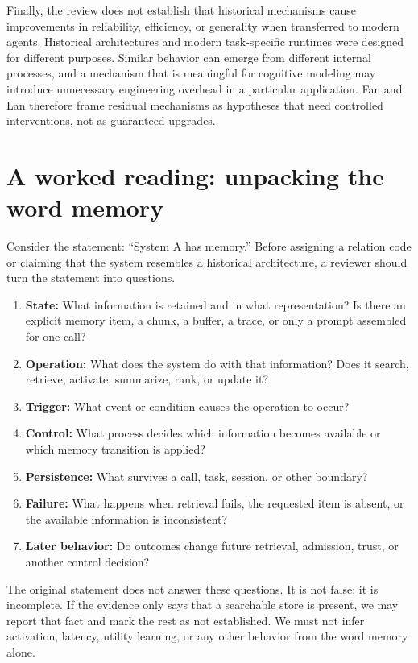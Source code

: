 Finally, the review does not establish that historical mechanisms cause improvements in reliability, efficiency, or generality when transferred to modern agents. Historical architectures and modern task-specific runtimes were designed for different purposes. Similar behavior can emerge from different internal processes, and a mechanism that is meaningful for cognitive modeling may introduce unnecessary engineering overhead in a particular application. Fan and Lan therefore frame residual mechanisms as hypotheses that need controlled interventions, not as guaranteed upgrades.

\section{A worked reading: unpacking the word memory}
\label{sec:worked-reading-memory}

\BookExampleLabel{} Consider the statement: ``System A has memory.'' Before assigning a relation code or claiming that the system resembles a historical architecture, a reviewer should turn the statement into questions.

\begin{enumerate}
  \item \textbf{State:} What information is retained and in what representation? Is there an explicit memory item, a chunk, a buffer, a trace, or only a prompt assembled for one call?
  \item \textbf{Operation:} What does the system do with that information? Does it search, retrieve, activate, summarize, rank, or update it?
  \item \textbf{Trigger:} What event or condition causes the operation to occur?
  \item \textbf{Control:} What process decides which information becomes available or which memory transition is applied?
  \item \textbf{Persistence:} What survives a call, task, session, or other boundary?
  \item \textbf{Failure:} What happens when retrieval fails, the requested item is absent, or the available information is inconsistent?
  \item \textbf{Later behavior:} Do outcomes change future retrieval, admission, trust, or another control decision?
\end{enumerate}

The original statement does not answer these questions. It is not false; it is incomplete. If the evidence only says that a searchable store is present, we may report that fact and mark the rest as not established. We must not infer activation, latency, utility learning, or any other behavior from the word memory alone.

